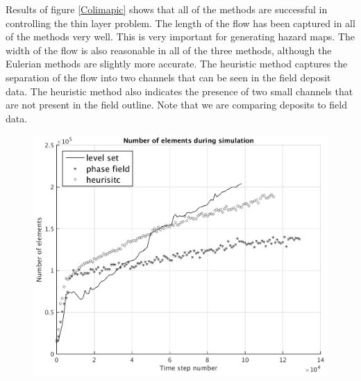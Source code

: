 \documentclass[review]{elsarticle}
\begin{document}
Results of figure \ref{Colimapic} shows that all of the methods are successful in controlling the thin layer problem. 
The length of the flow has been captured in all of the methods very well.  This is very important for generating hazard maps. 
The width of the flow is also reasonable in all of the three methods, although the Eulerian methods are slightly more accurate.
The heuristic method captures the separation of the flow into two channels that can be seen in the field deposit data. The heuristic method 
also indicates the presence of two small channels that are not present in the field outline. Note that we are comparing deposits to 
field data.
\begin{figure}[H]
        \begin{minipage}[b]{.5\linewidth}
                \centering
                \includegraphics[width=1\textwidth]{IMAGES/colima_num_elem.png}
                \label{col_amr}
                

\end{minipage}
\end{figure}
\end{document}
